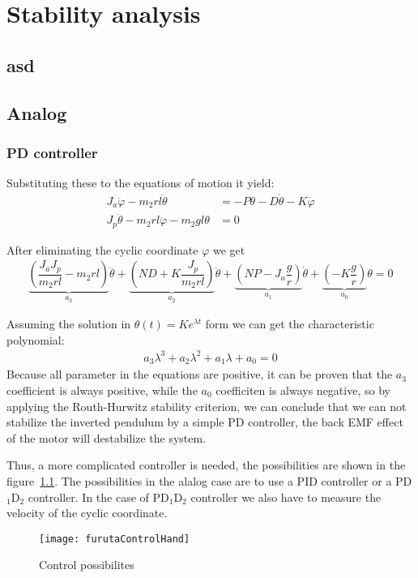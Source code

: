 \chapter{Stability analysis }

\section{asd}

\section{Analog}
\subsection{PD controller}
\noindent 
Substituting these to the equations of motion it yield:
%
\begin{align}
J_a \ddot \varphi -m_2 r l \ddot \theta	&=  -P\theta -D\dot\theta-K\dot \varphi
\\
J_p \ddot \theta -m_2 r l \ddot \varphi - m_2 g l \theta &= 0
\end{align}


\noindent
After eliminating the cyclic coordinate $\varphi$ we get
\begin{align}
\underbrace{
	\left(
	\dfrac{J_a J_p}{m_2 r l} - m_2 r l
	\right)
}_{a_3}
\dddot{\theta}
+
\underbrace{
	\left(
	ND+K\dfrac{J_p}{m_2 r l}
	\right)
}_{a_2}
\ddot \theta
+
\underbrace{
	\left(
	NP-J_a\dfrac{g}{r}
	\right)
}_{a_1}
\dot \theta
+
\underbrace{
	\left(
	-K\dfrac{g}{r}
	\right)
}_{a_0}
\theta	
%
=
0
\end{align}

\noindent 
Assuming the solution in $\theta (t) = K e^{\lambda t}$ form we can get the characteristic polynomial:
\begin{align}
a_3\lambda^3 + a_2\lambda^2 + a_1\lambda +a_0 =0
\end{align}
Because all parameter in the  equations are positive, it can be proven that the $a_3$ coefficient is always positive, while the $a_0$ coefficiten is always negative, so by applying the Routh-Hurwitz stability criterion, we can conclude that we can not stabilize the inverted pendulum by a simple PD controller, the back EMF effect of the motor will destabilize the system. 

Thus, a more complicated controller is needed, the possibilities are shown in the figure~\ref{fig:furutacontrolhand}. The possibilities in the alalog case are to use a PID controller or a PD$_1$D$_2$ controller. In the case of PD$_1$D$_2$ controller we also have to measure the velocity of the cyclic coordinate. 
\begin{figure}[p]
	\centering
	\texttt{[image: furutaControlHand]}
	\caption{Control possibilites}\label{fig:furutacontrolhand}
\end{figure}



